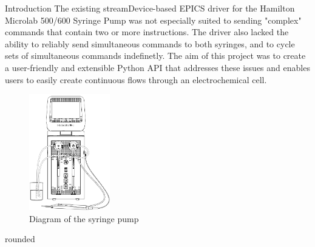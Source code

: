 \documentclass[a0paper,landscape,fontscale=0.35]{baposter}
\begin{document}
\begin{poster}
\begin{posterbox}[name=introduction,column=0]{Introduction}
The existing streamDevice-based EPICS driver for the Hamilton Microlab 500/600 Syringe Pump was not
especially suited to sending "complex" commands that contain two or more instructions.
The driver also lacked the ability to reliably send simultaneous commands to both syringes, and to
cycle sets of simultaneous commands indefinetly. The aim of this project was to create a user-friendly
and extensible Python API that addresses these issues and enables users to easily create continuous flows
through an electrochemical cell.
\begin{figure}[H]
\begin{center}
\includegraphics[width=100pt]{images/syringediagram}
\caption{Diagram of the syringe pump}
\end{center}
\end{figure}
\end{posterbox}
\begin{posterbox}[name=remotework,column=0,headerfont={},headershape=rounded,boxheaderheight=0em,boxColorOne=white,borderColor=white,below=introduction]{rounded}
\begin{figure}[H]
\begin{center}
\vspace{-1em}

\end{center}
\end{figure}
\end{posterbox}
\end{poster}
\end{document}
